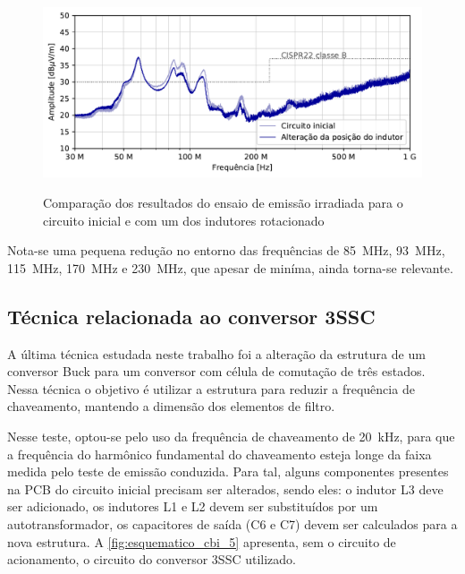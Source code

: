     \begin{figure}[H]
    	\centering
    	\caption{Comparação dos resultados do ensaio de emissão irradiada para o circuito inicial e com um dos indutores rotacionado}
    	\includegraphics[scale=.9]{pdf/rad/Alteração da posição do indutor.pdf}
    	\label{fig:med_rad_indutor}
    \end{figure}
    
    Nota-se uma pequena redução no entorno das frequências de \SI{85}{\mega\hertz}, \SI{93}{\mega\hertz}, \SI{115}{\mega\hertz}, \SI{170}{\mega\hertz} e \SI{230}{\mega\hertz}, que apesar de miníma, ainda torna-se relevante. 
    
    \subsection{Técnica relacionada ao conversor 3SSC} \label{cap:result_tecnicas_3ssc}
    
    A última técnica estudada neste trabalho foi a alteração da estrutura de um conversor Buck \interleaved para um conversor com célula de comutação de três estados. Nessa técnica o objetivo é utilizar a estrutura para reduzir a frequência de chaveamento, mantendo a dimensão dos elementos de filtro. 
    
    Nesse teste, optou-se pelo uso da frequência de chaveamento de \SI{20}{\kilo\hertz}, para que a frequência do harmônico fundamental do chaveamento esteja longe da faixa medida pelo teste de emissão conduzida. Para tal, alguns componentes presentes na PCB do circuito inicial precisam ser alterados, sendo eles: o indutor L3 deve ser adicionado, os indutores L1 e L2 devem ser substituídos por um autotransformador, os capacitores de saída (C6 e C7) devem ser calculados para a nova estrutura. A \autoref{fig:esquematico_cbi_5} apresenta, sem o circuito de acionamento, o circuito do conversor 3SSC utilizado. 
    
